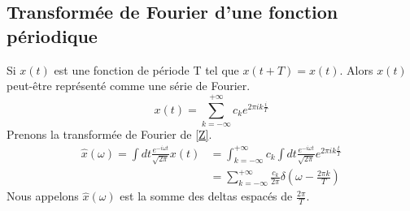 \documentclass[../notesdecours.tex]{subfiles}
\begin{document}
\subsection{Transformée de Fourier d'une fonction périodique}
Si $x(t)$ est une fonction de période T tel que $x(t+T) = x(t)$. Alors $x(t)$ peut-être représenté comme une série de Fourier.
\begin{equation}
x(t) = \sum_{k = -\infty}^{+\infty} c_ke^{2\pi ik\frac{i}{T}}
\label{Z}
\end{equation}
Prenons la transformée de Fourier de \eqref{Z}.
\begin{align}
\hat{x} (\omega ) = \int dt \frac{e^{-i\omega t}}{\sqrt{2\pi}} x(t) &= \int_{k = -\infty}^{+\infty} c_k \int dt \frac{e^{-i\omega t}}{\sqrt{2\pi}}e^{2\pi i k \frac{t}{T}}\\
&= \sum_{k = -\infty}^{+\infty} \frac{c_k}{2\pi} \delta (\omega - \frac{2\pi k}{T})
\end{align}
Nous appelons $\hat{x}(\omega)$ est la somme des deltas espacés de $\frac{2\pi}{T}$.
\end{document}
